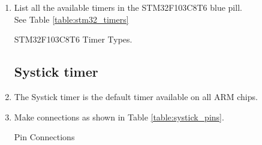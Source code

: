 \documentclass[journal,12pt,twocolumn]{IEEEtran}
\renewcommand\thesection{\arabic{section}}
\renewcommand\thesubsection{\thesection.\arabic{subsection}}
\begin{document}
\begin{enumerate}[label=\thesubsection.\arabic*.,ref=\thesubsection.\theenumi]
\item List all the available timers in the STM32F103C8T6 blue pill.
\\
\solution  See Table \ref{table:stm32_timers}
\begin{table}[!ht]
\centering
\footnotesize

\caption{STM32F103C8T6 Timer Types.}
\label{table:stm32_timers}
\end{table}

\subsection{Systick timer}
\item The Systick timer is the default timer available on all ARM chips. 
\item Make connections as shown in Table \ref{table:systick_pins}.
\begin{table}[!ht]
\centering
\footnotesize

\caption{Pin Connections}
\label{table:systick_pins}
\end{table}


\end{enumerate}
\end{document}
